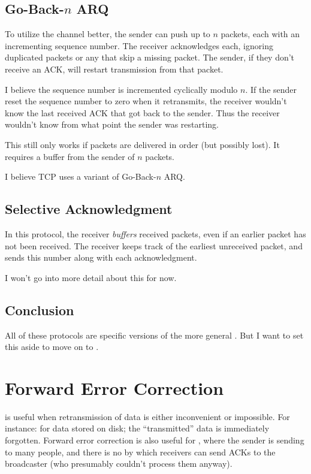 \documentclass[11pt, oneside]{amsart}
\begin{document}
\subsection{Go-Back-$n$ ARQ}

To utilize the channel better, the sender can push up to $n$ packets,
each with an incrementing sequence number. The receiver acknowledges
each, ignoring duplicated packets or any that skip a missing packet. The
sender, if they don't receive an ACK, will restart transmission from
that packet.

I believe the sequence number is incremented cyclically modulo $n$. If
the sender reset the sequence number to zero when it retransmits, the
receiver wouldn't know the last received ACK that got back to the
sender. Thus the receiver wouldn't know from what point the sender was
restarting.

This still only works if packets are delivered in order (but possibly
lost). It requires a buffer from the sender of $n$ packets.

I believe TCP uses a variant of Go-Back-$n$ ARQ.

\subsection{Selective Acknowledgment}

In this protocol, the receiver \emph{buffers} received packets, even if
an earlier packet has not been received. The receiver keeps track of the
earliest unreceived packet, and sends this number along with each
acknowledgment.

I won't go into more detail about this for now.

\subsection{Conclusion}

All of these protocols are specific versions of the more general
. But I want to set this aside to move
on to .

\section{Forward Error Correction}

 is useful when retransmission of data
is either inconvenient or impossible. For instance: for data stored on
disk; the ``transmitted'' data is immediately forgotten. Forward error
correction is also useful for , where the
sender is sending to many people, and there is no 
by which receivers can send ACKs to the broadcaster (who presumably
couldn't process them anyway).
\end{document}
